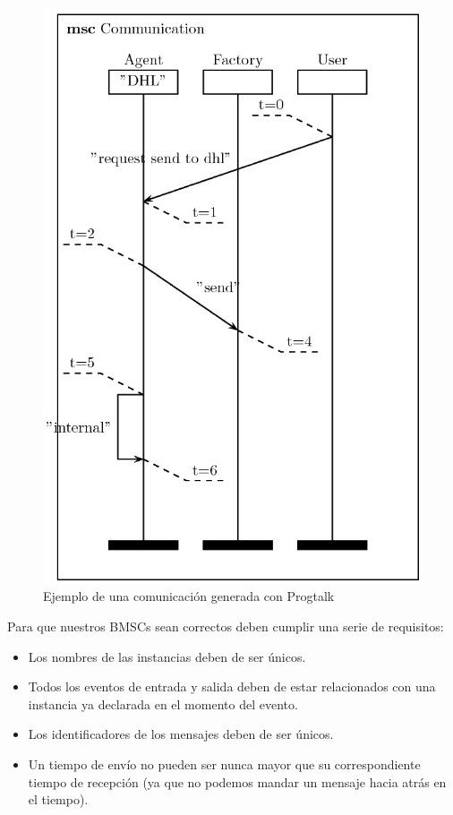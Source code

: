 \begin{figure}
  \centering
  \includegraphics[scale=0.5]{./images/fig1.png}
  \caption{Ejemplo de una comunicación generada con Progtalk}
  \label{fig:fig1}
\end{figure}

Para que nuestros BMSCs sean correctos deben cumplir una serie de requisitos:
\begin{itemize}
\item Los nombres de las instancias deben de ser únicos.
\item Todos los eventos de entrada y salida deben de estar
  relacionados con una instancia ya declarada en el momento del
  evento.
\item Los identificadores de los mensajes deben de ser únicos.
\item Un tiempo de envío no pueden ser nunca mayor que su
  correspondiente tiempo de recepción (ya que no podemos mandar un
  mensaje hacia atrás en el tiempo).
\end{itemize}


